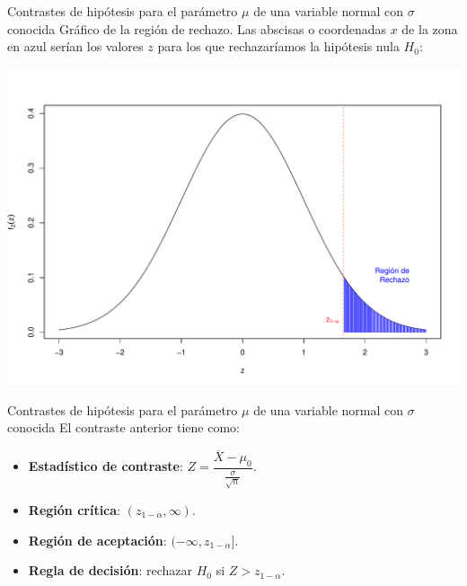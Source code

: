 \documentclass[
  ignorenonframetext,
]{beamer}
\begin{document}
\begin{frame}{Contrastes de hipótesis para el parámetro \(\mu\) de una
variable normal con \(\sigma\) conocida}
\protect\hypertarget{contrastes-de-hipuxf3tesis-para-el-paruxe1metro-mu-de-una-variable-normal-con-sigma-conocida-4}{}
Gráfico de la región de rechazo. Las abscisas o coordenadas \(x\) de la
zona en azul serían los valores \(z\) para los que rechazaríamos la
hipótesis nula \(H_0\):

\begin{center}\includegraphics{contrastes_dos_muestras_files/figure-beamer/unnamed-chunk-1-1} \end{center}
\end{frame}

\begin{frame}{Contrastes de hipótesis para el parámetro \(\mu\) de una
variable normal con \(\sigma\) conocida}
\protect\hypertarget{contrastes-de-hipuxf3tesis-para-el-paruxe1metro-mu-de-una-variable-normal-con-sigma-conocida-5}{}
El contraste anterior tiene como:

\begin{itemize}[<+->]
\item
  \textbf{Estadístico de contraste}:
  \(Z=\dfrac{\overline{X}-\mu_0}{\frac{\sigma}{\sqrt{n}}}\).
\item
  \textbf{Región crítica}: \((z_{1-\alpha},\infty)\).
\item
  \textbf{Región de aceptación}: \((-\infty,z_{1-\alpha}]\).
\item
  \textbf{Regla de decisión}: rechazar \(H_0\) si \(Z>z_{1-\alpha}\).
\end{itemize}
\end{frame}
\end{document}

